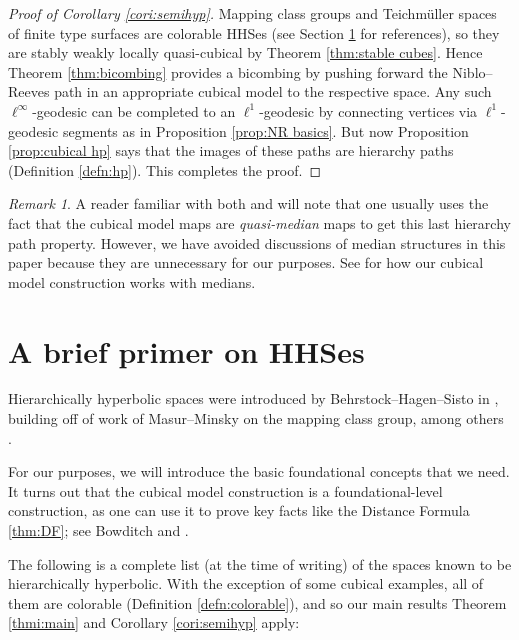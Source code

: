 \documentclass{amsart}
\theoremstyle{definition}
\theoremstyle{remark}
\newtheorem{remark}[theorem]{Remark}
\theoremstyle{definition}
\begin{document}
\begin{proof}[Proof of Corollary \ref{cori:semihyp}]
Mapping class groups and Teichm\"uller spaces of finite type surfaces are colorable HHSes (see Section \ref{sec:HHS} for references), so they are stably weakly locally quasi-cubical by Theorem \ref{thm:stable cubes}.  Hence Theorem \ref{thm:bicombing} provides a bicombing by pushing forward the Niblo--Reeves path in an appropriate cubical model to the respective space.  Any such $\ell^{\infty}$-geodesic can be completed to an $\ell^1$-geodesic by connecting vertices via $\ell^1$-geodesic segments as in Proposition \ref{prop:NR basics}.  But now Proposition \ref{prop:cubical hp} says that the images of these paths are hierarchy paths (Definition \ref{defn:hp}).  This completes the proof.
\end{proof}

\begin{remark}\label{rem:no medians}
A reader familiar with both \cite{HHS_quasi} and \cite{DMS_bary} will note that one usually uses the fact that the cubical model maps are \emph{quasi-median} maps to get this last hierarchy path property.  However, we have avoided discussions of median structures in this paper because they are unnecessary for our purposes.  See \cite[Section 15]{Dur_infcube} for how our cubical model construction works with medians.
\end{remark}


\section{A brief primer on HHSes}\label{sec:HHS}

Hierarchically hyperbolic spaces were introduced by Behrstock--Hagen--Sisto in \cite{HHS_I, HHS_II}, building off of work of Masur--Minsky \cite{MM99,MM00} on the mapping class group, among others \cite{Brock, Rafi:combo, Rafi:hypteich, Dur:augmented, EMR:rank}.

For our purposes, we will introduce the basic foundational concepts that we need.  It turns out that the cubical model construction is a foundational-level construction, as one can use it to prove key facts like the Distance Formula \ref{thm:DF}; see Bowditch \cite{Bowditch_hulls} and \cite{Dur_infcube}.

The following is a complete list (at the time of writing) of the spaces known to be hierarchically hyperbolic.  With the exception of some cubical examples, all of them are colorable (Definition \ref{defn:colorable}), and so our main results Theorem \ref{thmi:main} and Corollary \ref{cori:semihyp} apply:
\end{document}
